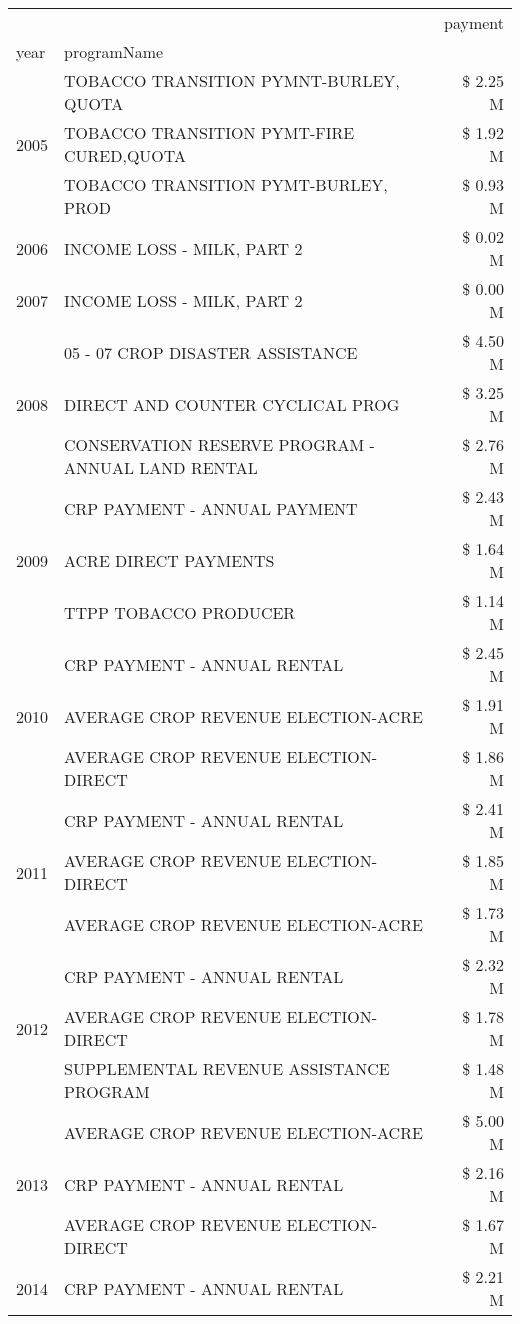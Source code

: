 \begin{tabular}{llr}
\toprule
 &  & payment \\
year & programName &  \\
\midrule
\multirow[t]{3}{*}{2005} & TOBACCO TRANSITION PYMNT-BURLEY, QUOTA & \$ 2.25 M \\
 & TOBACCO TRANSITION PYMT-FIRE CURED,QUOTA & \$ 1.92 M \\
 & TOBACCO TRANSITION PYMT-BURLEY, PROD & \$ 0.93 M \\
\cline{1-3}
2006 & INCOME LOSS - MILK, PART 2 & \$ 0.02 M \\
\cline{1-3}
2007 & INCOME LOSS - MILK, PART 2 & \$ 0.00 M \\
\cline{1-3}
\multirow[t]{3}{*}{2008} & 05 - 07 CROP DISASTER ASSISTANCE & \$ 4.50 M \\
 & DIRECT AND COUNTER CYCLICAL PROG & \$ 3.25 M \\
 & CONSERVATION RESERVE PROGRAM - ANNUAL LAND RENTAL & \$ 2.76 M \\
\cline{1-3}
\multirow[t]{3}{*}{2009} & CRP PAYMENT - ANNUAL PAYMENT & \$ 2.43 M \\
 & ACRE DIRECT PAYMENTS & \$ 1.64 M \\
 & TTPP TOBACCO PRODUCER & \$ 1.14 M \\
\cline{1-3}
\multirow[t]{3}{*}{2010} & CRP PAYMENT - ANNUAL RENTAL & \$ 2.45 M \\
 & AVERAGE CROP REVENUE ELECTION-ACRE & \$ 1.91 M \\
 & AVERAGE CROP REVENUE ELECTION-DIRECT & \$ 1.86 M \\
\cline{1-3}
\multirow[t]{3}{*}{2011} & CRP PAYMENT - ANNUAL RENTAL & \$ 2.41 M \\
 & AVERAGE CROP REVENUE ELECTION-DIRECT & \$ 1.85 M \\
 & AVERAGE CROP REVENUE ELECTION-ACRE & \$ 1.73 M \\
\cline{1-3}
\multirow[t]{3}{*}{2012} & CRP PAYMENT - ANNUAL RENTAL & \$ 2.32 M \\
 & AVERAGE CROP REVENUE ELECTION-DIRECT & \$ 1.78 M \\
 & SUPPLEMENTAL REVENUE ASSISTANCE PROGRAM & \$ 1.48 M \\
\cline{1-3}
\multirow[t]{3}{*}{2013} & AVERAGE CROP REVENUE ELECTION-ACRE & \$ 5.00 M \\
 & CRP PAYMENT - ANNUAL RENTAL & \$ 2.16 M \\
 & AVERAGE CROP REVENUE ELECTION-DIRECT & \$ 1.67 M \\
\cline{1-3}
\multirow[t]{3}{*}{2014} & CRP PAYMENT - ANNUAL RENTAL & \$ 2.21 M \\

\end{tabular}
